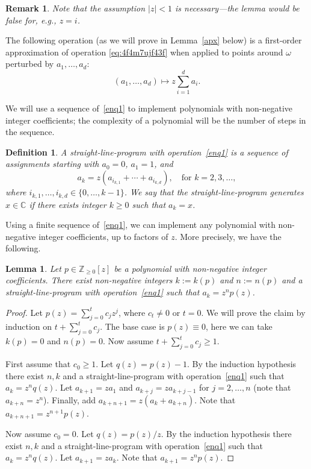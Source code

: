 \documentclass[11pt]{article}
\newtheorem{lemma}[theorem]{Lemma}
\newtheorem{remark}[theorem]{Remark}
\newtheorem{definition}[theorem]{Definition}
\def\Complex{\mathbb{C}}
\begin{document}
\begin{remark}
Note that the assumption $|z|<1$ is necessary---the lemma would be false for, e.g., $z=i$.
\end{remark}

The following operation (as we will prove in Lemma~\ref{apx} below) is a first-order approximation of operation \eqref{eq:4f4m7ujf43f} when applied to points around $\omega$ perturbed by $a_1,\dots,a_d$:
\begin{equation}\label{enq1}
(a_1,\dots,a_d)\mapsto z\sum_{i=1}^d a_i.
\end{equation}

We will use a sequence of~\eqref{enq1} to implement polynomials with non-negative integer
coefficients; the complexity of a polynomial will be the number of steps in the sequence.

\begin{definition}
A straight-line-program with operation~\eqref{enq1} is a sequence of assignments starting with $a_0 = 0$, $a_1 = 1$, and
$$
a_k = z \left(a_{i_{k,1}}+\cdots+a_{i_{k,d}}\right),\quad\mbox{for $k=2,3,\dots$},
$$ where $i_{k,1},\dots,i_{k,d}\in\{0,\dots,k-1\}$. We say that the straight-line-program generates $x\in \Complex$ if there exists integer $k\geq 0$ such that $a_k=x$.
\end{definition}

Using a finite sequence of~\eqref{enq1}, we can implement any polynomial with non-negative integer coefficients, up to factors of $z$. More precisely, we have the following.
\begin{lemma}\label{getpo}
Let $p\in {\mathbb Z_{\geq 0}}[z]$ be a polynomial with non-negative integer coefficients.
There exist non-negative integers $k:=k(p)$ and $n:=n(p)$ and a straight-line-program with operation~\eqref{enq1}
such that $a_{k} = z^{n} p(z)$.
\end{lemma}

\begin{proof}
Let $p(z)=\sum_{j=0}^t c_j z^j$, where $c_t\neq 0$ or $t=0$.  We will prove the claim by induction on $t+\sum_{j=0}^t c_j$. The base case is $p(z)\equiv 0$,
here we can take $k(p)=0$ and $n(p)=0$. Now assume $t+\sum_{j=0}^t c_j\geq 1$.

First assume that $c_0\geq 1$. Let $q(z)=p(z)-1$. By the induction hypothesis there exist $n,k$ and a straight-line-program with operation~\eqref{enq1}
such that $a_k = z^{n} q(z)$. Let $a_{k+1} = z a_1$ and $a_{k+j} = z a_{k+j-1}$ for $j=2,\dots,n$ (note that
$a_{k+n} = z^n$). Finally, add $a_{k+n+1} = z (a_k + a_{k+n})$. Note that $a_{k+n+1} = z^{n+1} p(z)$.

Now assume $c_0=0$. Let $q(z)=p(z)/z$. By the induction hypothesis there exist $n,k$ and a straight-line-program with operation~\eqref{enq1}
such that $a_k = z^{n} q(z)$. Let $a_{k+1} = z a_k$. Note that $a_{k+1} = z^n p(z)$.
\end{proof}
\end{document}
